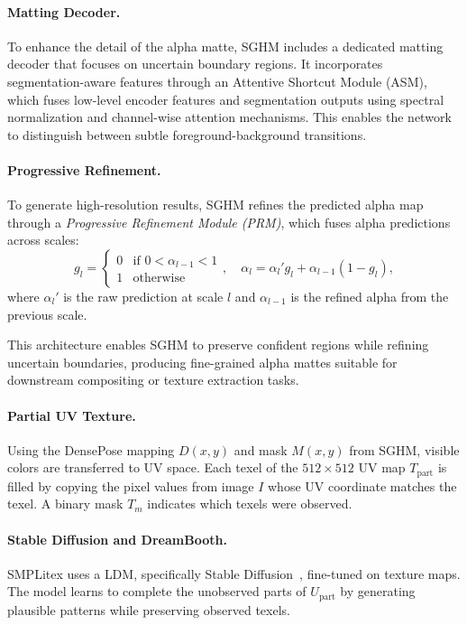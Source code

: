 \paragraph{Matting Decoder.} To enhance the detail of the alpha matte, SGHM includes a dedicated matting decoder that focuses on uncertain boundary regions. It incorporates segmentation-aware features through an Attentive Shortcut Module (ASM), which fuses low-level encoder features and segmentation outputs using spectral normalization and channel-wise attention mechanisms. This enables the network to distinguish between subtle foreground-background transitions.

\paragraph{Progressive Refinement.} To generate high-resolution results, SGHM refines the predicted alpha map through a \textit{Progressive Refinement Module (PRM)}, which fuses alpha predictions across scales:
\begin{equation}
g_l = 
\begin{cases}
0 & \text{if } 0 < \alpha_{l-1} < 1 \\
1 & \text{otherwise}
\end{cases}
,\quad
\alpha_l = \alpha_l' g_l + \alpha_{l-1} (1 - g_l),
\end{equation}
where $\alpha_l'$ is the raw prediction at scale $l$ and $\alpha_{l-1}$ is the refined alpha from the previous scale.

This architecture enables SGHM to preserve confident regions while refining uncertain boundaries, producing fine-grained alpha mattes suitable for downstream compositing or texture extraction tasks.


\paragraph{Partial UV Texture.}
Using the DensePose mapping $D(x,y)$ and mask $M(x,y)$ from SGHM, visible colors are transferred to UV space. Each texel of the $512 \times 512$ UV map $T_{\text{part}}$ is filled by copying the pixel values from image $I$ whose UV coordinate matches the texel. A binary mask $T_m$ indicates which texels were observed.

\paragraph{Stable Diffusion and DreamBooth.}
SMPLitex uses a \ac{LDM}, specifically Stable Diffusion~\cite{rombach2021highresolution}, fine-tuned on texture maps. The model learns to complete the unobserved parts of $U_{\text{part}}$ by generating plausible patterns while preserving observed texels.

